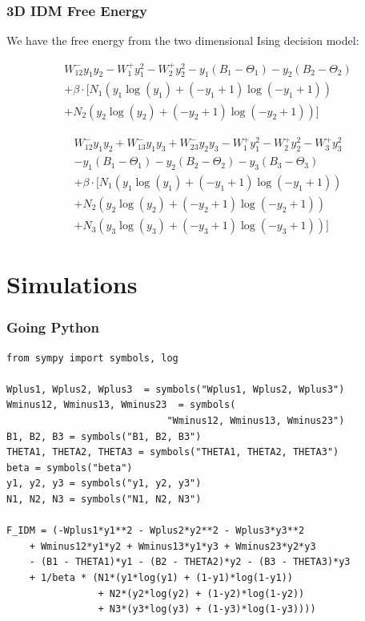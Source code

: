 \documentclass[xcolor={fixpdftex,hyperref,x11names},10pt,pdftex,hyperref={pdftex}]{beamer}
\begin{document}
\begin{frame}
  \frametitle{3D IDM Free Energy}
  We have the free energy from the two dimensional Ising decision model:

\begin{equation*}
    \begin{split}
    W^-_{12} y_{1} y_{2} - W^+_{1} y_{1}^{2} - W^+_{2} y_{2}^{2} - y_{1}
    (B_{1} - \Theta_{1}) - y_{2} (B_{2} - \Theta_{2})\\
    + \beta \cdot [N_{1} (y_{1} \operatorname{log}(y_{1}) + (- y_{1} + 1)
    \operatorname{log}(- y_{1} + 1))\\
    + N_{2} (y_{2} \operatorname{log}(y_{2}) + (- y_{2} + 1)
    \operatorname{log}(- y_{2} + 1))]
    \end{split}
\end{equation*}

\begin{equation*}
    \begin{split}
    W^-_{12} y_{1} y_{2} + W^-_{13} y_{1} y_{3} + W^-_{23} y_{2} y_{3} -
    W^+_{1} y_{1}^{2} - W^+_{2} y_{2}^{2} - W^+_{3} y_{3}^{2} \\
    - y_{1} (B_{1} - \Theta_{1}) - y_{2} (B_{2} -
    \Theta_{2}) - y_{3} (B_{3} - \Theta_{3}) \\
    + \beta \cdot [N_{1} (y_{1} \operatorname{log}(y_{1}) + (- y_{1} + 1)
    \operatorname{log}(- y_{1} + 1))\\
    + N_{2} (y_{2} \operatorname{log}(y_{2}) + (- y_{2} + 1)
    \operatorname{log}(- y_{2} + 1))\\
    + N_{3} (y_{3} \operatorname{log}(y_{3}) + (- y_{3} +
    1) \operatorname{log}(- y_{3} + 1))]
    \end{split}
\end{equation*}
\end{frame}

\section{Simulations}
\label{sec:simu}

\begin{frame}[fragile]
  \frametitle{Going Python}
  \begin{lstlisting}
from sympy import symbols, log

Wplus1, Wplus2, Wplus3  = symbols("Wplus1, Wplus2, Wplus3")
Wminus12, Wminus13, Wminus23  = symbols(
                            "Wminus12, Wminus13, Wminus23")
B1, B2, B3 = symbols("B1, B2, B3")
THETA1, THETA2, THETA3 = symbols("THETA1, THETA2, THETA3")
beta = symbols("beta")
y1, y2, y3 = symbols("y1, y2, y3")
N1, N2, N3 = symbols("N1, N2, N3")

F_IDM = (-Wplus1*y1**2 - Wplus2*y2**2 - Wplus3*y3**2
    + Wminus12*y1*y2 + Wminus13*y1*y3 + Wminus23*y2*y3
    - (B1 - THETA1)*y1 - (B2 - THETA2)*y2 - (B3 - THETA3)*y3
    + 1/beta * (N1*(y1*log(y1) + (1-y1)*log(1-y1))
                + N2*(y2*log(y2) + (1-y2)*log(1-y2))
                + N3*(y3*log(y3) + (1-y3)*log(1-y3))))
  \end{lstlisting}
\end{frame}
\end{document}
